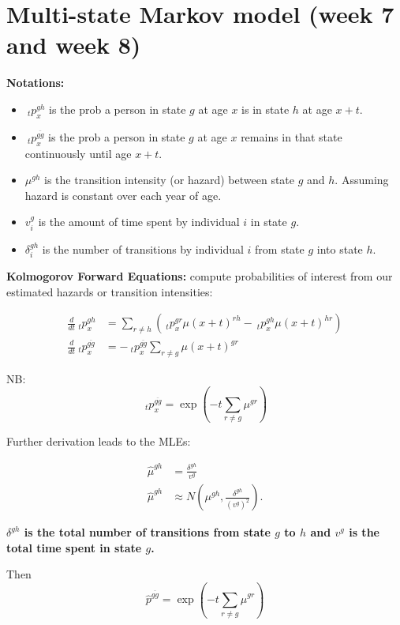 \documentclass[a4paper]{article}
\begin{document}
\section{Multi-state Markov model (week 7 and week 8)}

\textbf{Notations:}\begin{itemize}
	\item $\ _tp^{gh}_x$ is the prob a person in state $g$ at age $x$ is in state $h$ at age $x+t$.
	\item $\ _tp^{\overline{gg}}_x$ is the prob a person in state $g$ at age $x$ remains in that state continuously until age $x+t$.
	\item $\mu^{gh}$ is the transition intensity (or hazard) between state $g$ and $h$. Assuming hazard is constant over each year of age.
	\item $v_i^g$ is the amount of time spent by individual $i$ in state $g$.
	\item $\delta_i^{gh}$ is the number of transitions by individual $i$ from state $g$ into state $h$.
\end{itemize}

\textbf{Kolmogorov Forward Equations:} compute probabilities of interest from our estimated hazards or transition intensities:

\begin{equation}
	\begin{split}
		\frac{d}{dt}\ _tp_x^{gh}&=\sum_{r\not=h}(\ _tp_x^{gr}\mu(x+t)^{rh}-\ _tp_x^{gh}\mu(x+t)^{hr})\\
		\frac{d}{dt}\ _tp_x^{\overline{gg}}&=-\ _tp_x^{\overline{gg}}\sum_{r\not= g}\mu(x+t)^{gr}
	\end{split}
\end{equation}

NB: $$\ _tp_x^{\overline{gg}}=\exp(-t\sum_{r\not=g}\mu^{gr})$$

Further derivation leads to the MLEs:

\begin{equation}
	\begin{split}
		\hat{\mu}^{gh}&=\frac{\delta^{gh}}{v^g}\\
		\hat{\mu}^{gh}&\approx N(\mu^{gh},\frac{\delta^{gh}}{(v^g)^2}).
	\end{split}
\end{equation}

\textbf{$\delta^{gh}$ is the total number of transitions from state $g$ to $h$ and $v^g$ is the total time spent in state $g$.}

Then $$\hat{p}^{\overline{gg}}=\exp(-t\sum_{r\not=g}\hat{\mu}^{gr})$$
\end{document}
